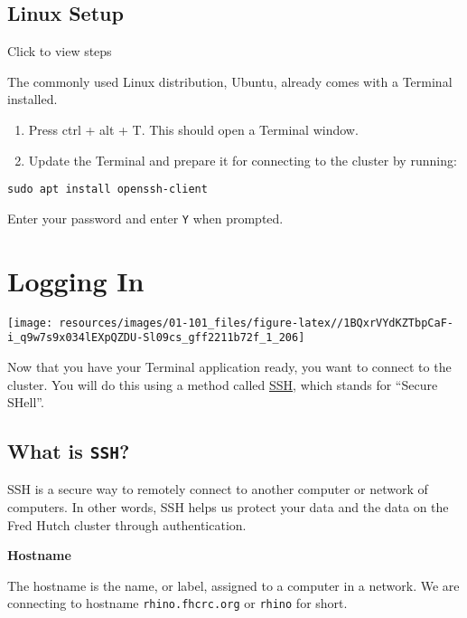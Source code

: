 \documentclass[
]{book}
\begin{document}
\hypertarget{linux}{%
\section{Linux Setup}\label{linux}}

Click to view steps

The commonly used Linux distribution, Ubuntu, already comes with a Terminal installed.

\begin{enumerate}
\def\labelenumi{\arabic{enumi}.}
\item
  Press ctrl + alt + T. This should open a Terminal window.
\item
  Update the Terminal and prepare it for connecting to the cluster by running:
\end{enumerate}

\begin{verbatim}
sudo apt install openssh-client
\end{verbatim}

Enter your password and enter \texttt{Y} when prompted.

\hypertarget{logging-in}{%
\chapter{Logging In}\label{logging-in}}

\texttt{[image: resources/images/01-101\_files/figure-latex//1BQxrVYdKZTbpCaF-i\_q9w7s9x034lEXpQZDU-Sl09cs\_gff2211b72f\_1\_206]}

Now that you have your Terminal application ready, you want to connect to the cluster. You will do this using a method called \href{https://www.ssh.com/academy/ssh/protocol}{SSH}, which stands for ``Secure SHell''.

\hypertarget{what-is-ssh}{%
\section{\texorpdfstring{What is \texttt{SSH}?}{What is SSH?}}\label{what-is-ssh}}

SSH is a secure way to remotely connect to another computer or network of computers. In other words, SSH helps us protect your data and the data on the Fred Hutch cluster through authentication.

\textbf{Hostname}

The hostname is the name, or label, assigned to a computer in a network. We are connecting to hostname \texttt{rhino.fhcrc.org} or \texttt{rhino} for short.
\end{document}
